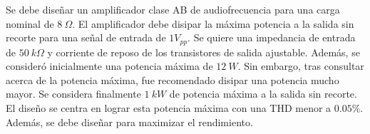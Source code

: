 



Se debe diseñar un amplificador clase AB de audiofrecuencia para una carga nominal de $8 \ \Omega$. El amplificador debe disipar la máxima potencia a la salida sin recorte para una señal de entrada de $1 V_{pp}$. Se quiere una impedancia de entrada de $50 \ k\Omega$ y corriente de reposo de los transistores de salida ajustable. Además, se consideró inicialmente una potencia máxima de $12 \ W$. Sin embargo, tras consultar acerca de la potencia máxima, fue recomendado disipar una potencia mucho mayor. Se considera finalmente $1 \ kW$ de potencia máxima a la salida sin recorte. El diseño se centra en lograr esta potencia máxima con una THD menor a $0.05\%$. Además, se debe diseñar para maximizar el rendimiento.
 
